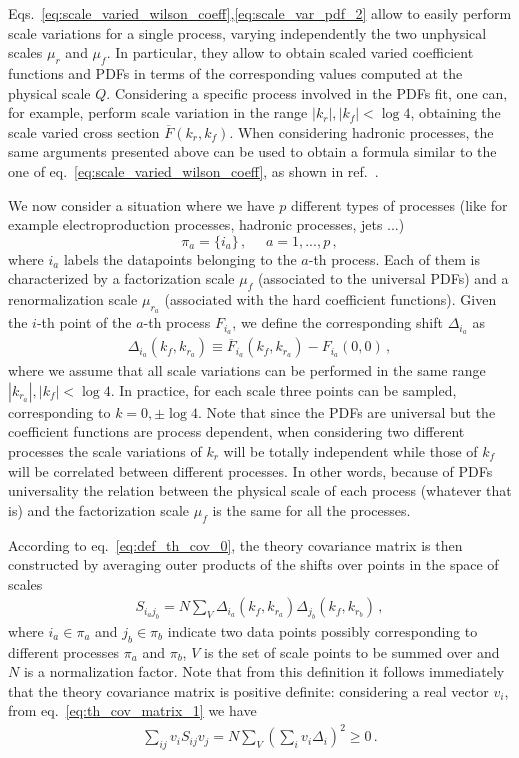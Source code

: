 %
Eqs.~\eqref{eq:scale_varied_wilson_coeff},\eqref{eq:scale_var_pdf_2} allow to easily perform scale variations for a single process,
varying independently the two unphysical scales $\mu_r$ and $\mu_f$.
In particular, they allow to obtain scaled varied coefficient functions and PDFs in terms of the corresponding values 
computed at the physical scale $Q$. 
Considering a specific process involved in the PDFs fit, one can, for example, perform scale variation in the range
$|k_r|, |k_f| < \log 4$, obtaining the scale varied cross section $\overline{F}\left(k_r, k_f\right)$.
When considering hadronic processes,
the same arguments presented above can be used to obtain a formula similar to the one of eq.~\eqref{eq:scale_varied_wilson_coeff},
as shown in ref.~\cite{AbdulKhalek:2019ihb}.

%
We now consider a situation where we have $p$ different types of processes (like for example electroproduction processes, 
hadronic processes, jets ...) 
\[\pi_a = \{i_a\}\,, \,\,\,\,\,\,\,\, a = 1,...,p\,,\] 
where $i_a$ labels the datapoints belonging to the $a$-th process.
Each of them is characterized by a factorization scale $\mu_f$ (associated to the universal PDFs) and a renormalization scale 
$\mu_{r_a}$ (associated with the hard coefficient functions).
Given the $i$-th point of the $a$-th process $F_{i_a}$, we define the corresponding shift $\Delta_{i_a}$ as 
\begin{align}
    \Delta_{i_a}\left(k_f,k_{r_a}\right) \equiv \overline{F}_{i_a}\left(k_f, k_{r_a}\right) - F_{i_a}\left(0, 0\right)\,,
\end{align}
where we assume that all scale variations can be performed in the same range $|k_{r_a}|, |k_f| < \log 4$.
In practice, for each scale three points can be sampled, corresponding to $k = 0, \pm \log 4$.
Note that since the PDFs are universal but the coefficient functions are process dependent,
when considering two different processes the scale variations of $k_{r}$ will be totally independent 
while those of $k_f$ will be correlated between different processes. 
In other words, because of PDFs universality the relation between the physical scale of each process (whatever that is)
and the factorization scale $\mu_f$ is the same for all the processes.

According to eq.~\eqref{eq:def_th_cov_0}, the theory covariance matrix is then constructed by averaging
outer products of the shifts over points in the space of scales 
\begin{align}
    \label{eq:th_cov_matrix_1}
    S_{i_{a}j_{b}} = N \sum_V \Delta_{i_a}\left(k_f,k_{r_a}\right) \Delta_{j_b}\left(k_f,k_{r_b}\right)\,,
\end{align} 
where $i_a \in \pi_a$ and $j_b \in \pi_b$ indicate two data points possibly corresponding to different
processes $\pi_a$ and $\pi_b$, $V$ is the set of scale points to be summed over and $N$ is a normalization factor.
Note that from this definition it follows immediately that the
theory covariance matrix is positive definite: considering a real vector $v_i$, from eq.~\eqref{eq:th_cov_matrix_1}
we have
\begin{align}
    \sum_{ij} v_i S_{ij} v_j = N \sum_{V}\left(\sum_i v_i \Delta_i\right)^2 \geq 0\,.
\end{align}

